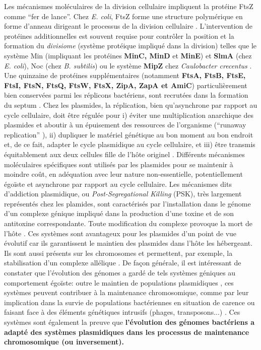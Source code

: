 	Les mécanismes moléculaires de la division cellulaire impliquent la protéine FtsZ comme “fer de lance”. Chez \textit{E. coli}, FtsZ forme une structure polymérique en forme d'anneau dirigeant le processus de la division cellulaire \citep{thanbichler2010}. L'intervention de protéines additionnelles est souvent requise pour contrôler la position et la formation du \textit{divisiome} (système protéique impliqué dans la division) telles que le système Min (impliquant les protéines \textbf{MinC, MinD} et \textbf{MinE}) et \textbf{SlmA} (chez \textit{E. coli}), Noc (chez \textit{B. subtilis}) ou le système \textbf{MipZ} chez \textit{Caulobacter crecentus} \citep{Thanbichler2010}. Une quinzaine de protéines supplémentaires (notamment \textbf{FtsA, FtsB, FtsE, FtsI, FtsN, FtsQ, FtsW, FtsX, ZipA, ZapA et AmiC}) particulièrement bien conservées parmi les réplicons bactériens, sont recrutées dans la formation du septum \citep{vicente2006septum}. Chez les plasmides, la réplication, bien qu'asynchrone par rapport au cycle cellulaire, doit être régulée pour i) éviter une multiplication anarchique des plasmides et aboutir à un épuisement des ressources de l'organisme (“runaway replication” \citep{DelSolar1998}), ii) dupliquer le matériel génétique au bon moment au bon endroit et, de ce fait, adapter le cycle plasmidique au cycle cellulaire, et iii) être transmis équitablement aux deux cellules fille de l'hôte originel \citep{Pinto2012}. Différents mécanismes moléculaires spécifiques sont utilisés par les plasmides pour se maintenir à moindre coût, en adéquation avec leur nature non-essentielle, potentiellement égoïste et asynchrone par rapport au cycle cellulaire. Les mécanismes dits d'addiction plasmidique, ou \textit{Post-Segregational Killing} (PSK), très largement représentés chez les plamides, sont caractérisés par l'installation dans le génome d'un complexe génique impliqué dans la production d'une toxine et de son antitoxine correspondante. Toute modification du complexe provoque la mort de l'hôte \citep{mochizuki2006genetic}. Ces systèmes sont avantageux pour les plasmides d'un point de vue évolutif car ils garantissent le maintien des plasmides dans l'hôte les hébergeant. Ils sont aussi présents sur les chromosomes et permettent, par exemple, la stabilisation d'un complexe allélique \citep{mochizuki2006genetic}. De façon générale, il est intéressant de constater que l'évolution des génomes a gardé de tels systèmes géniques au comportement égoïste: outre le maintien de populations plasmidiques \citep{mochizuki2006genetic}, ces systèmes peuvent contribuer à la maintenance chromosomique, comme par leur implication dans la survie de populations bactériennes en situation de carence ou faisant face à des éléments génétiques intrusifs (phages, transposons...) \citep{kobayashi2004genetic}. Ces systèmes sont également la preuve que \textbf{\color{orange}l'évolution des génomes bactériens a adapté des systèmes plasmidiques dans les processus de maintenance chromosomique (ou inversement).}

